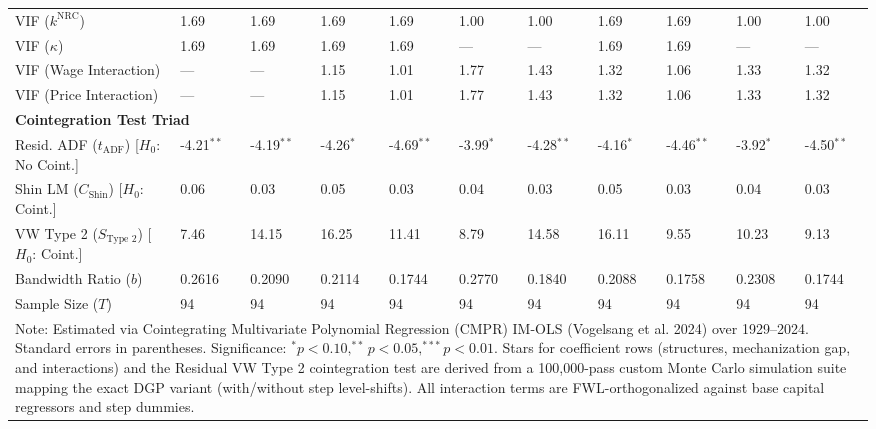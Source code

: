 \begin{table}[H]
\begin{tabular}{p{3.8cm}p{1.1cm}p{1.1cm}p{1.1cm}p{1.1cm}p{1.1cm}p{1.1cm}p{1.1cm}p{1.1cm}p{1.1cm}p{1.1cm}}
VIF ($k^{\text{NRC}}$) & 1.69 & 1.69 & 1.69 & 1.69 & 1.00 & 1.00 & 1.69 & 1.69 & 1.00 & 1.00 \\
VIF ($\kappa$) & 1.69 & 1.69 & 1.69 & 1.69 & --- & --- & 1.69 & 1.69 & --- & --- \\
VIF (Wage Interaction) & --- & --- & 1.15 & 1.01 & 1.77 & 1.43 & 1.32 & 1.06 & 1.33 & 1.32 \\
VIF (Price Interaction) & --- & --- & 1.15 & 1.01 & 1.77 & 1.43 & 1.32 & 1.06 & 1.33 & 1.32 \\
\midrule
\multicolumn{11}{l}{\textbf{Cointegration Test Triad}} \\
Resid. ADF ($t_{\text{ADF}}$) [$H_0$: No Coint.] & -4.21$^{**}$ & -4.19$^{**}$ & -4.26$^{*}$ & -4.69$^{**}$ & -3.99$^{*}$ & -4.28$^{**}$ & -4.16$^{*}$ & -4.46$^{**}$ & -3.92$^{*}$ & -4.50$^{**}$ \\
Shin LM ($C_{\text{Shin}}$) [$H_0$: Coint.] & 0.06 & 0.03 & 0.05 & 0.03 & 0.04 & 0.03 & 0.05 & 0.03 & 0.04 & 0.03 \\
VW Type 2 ($S_{\text{Type 2}}$) [$H_0$: Coint.] & 7.46 & 14.15 & 16.25 & 11.41 & 8.79 & 14.58 & 16.11 & 9.55 & 10.23 & 9.13 \\
\midrule
Bandwidth Ratio ($b$) & 0.2616 & 0.2090 & 0.2114 & 0.1744 & 0.2770 & 0.1840 & 0.2088 & 0.1758 & 0.2308 & 0.1744 \\
Sample Size ($T$) & 94 & 94 & 94 & 94 & 94 & 94 & 94 & 94 & 94 & 94 \\
\bottomrule
\multicolumn{11}{p{14.8cm}}{\footnotesize Note: Estimated via Cointegrating Multivariate Polynomial Regression (CMPR) IM-OLS (Vogelsang et al. 2024) over 1929--2024. Standard errors in parentheses. Significance: $^* p < 0.10, ^{**} p < 0.05, ^{***} p < 0.01$. Stars for coefficient rows (structures, mechanization gap, and interactions) and the Residual VW Type 2 cointegration test are derived from a 100,000-pass custom Monte Carlo simulation suite mapping the exact DGP variant (with/without step level-shifts). All interaction terms are FWL-orthogonalized against base capital regressors and step dummies.}
\end{tabular}
\end{table}
